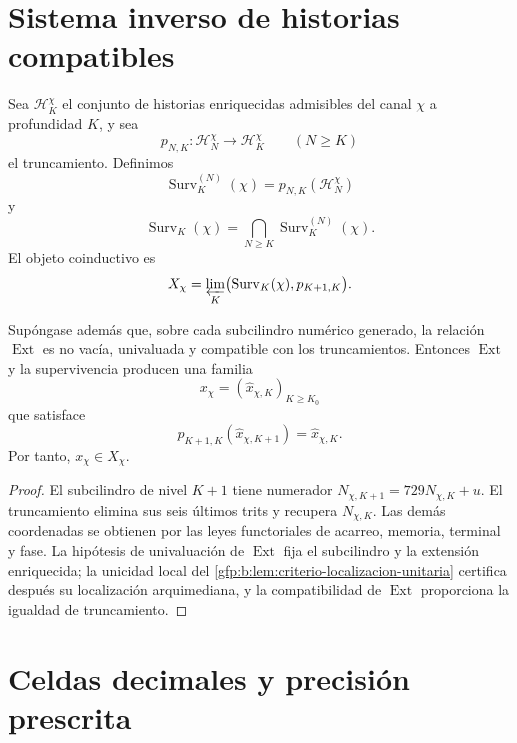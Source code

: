 \section{Sistema inverso de historias compatibles}

Sea \(\mathcal H_K^\chi\) el conjunto de historias enriquecidas admisibles
del canal \(\chi\) a profundidad \(K\), y sea
\[
 p_{N,K}:\mathcal H_N^\chi\longrightarrow\mathcal H_K^\chi
 \qquad(N\geq K)
\]
el truncamiento. Definimos
\[
 \operatorname{Surv}_K^{(N)}(\chi)
 =p_{N,K}(\mathcal H_N^\chi)
\]
y
\begin{equation}
 \operatorname{Surv}_K(\chi)
 =\bigcap_{N\geq K}\operatorname{Surv}_K^{(N)}(\chi).
 \label{gfp:b:eq:supervivencia-todas-profundidades}
\end{equation}
El objeto coinductivo es
\begin{equation}
 X_\chi=
 \varprojlim_K
 \bigl(\operatorname{Surv}_K(\chi),p_{K+1,K}\bigr).
 \label{gfp:b:eq:limite-inverso-caracteres}
\end{equation}

\begin{theorem}
\label{gfp:b:thm:seccion-compatible-caracteres}
Supóngase además que, sobre cada subcilindro numérico generado, la
relación \(\operatorname{Ext}\) es no vacía, univaluada y compatible con los
truncamientos. Entonces \(\operatorname{Ext}\) y la supervivencia producen una familia
\[
 x_\chi=(\widehat x_{\chi,K})_{K\geq K_0}
\]
que satisface
\[
 p_{K+1,K}(\widehat x_{\chi,K+1})
 =\widehat x_{\chi,K}.
\]
Por tanto, \(x_\chi\in X_\chi\).
\end{theorem}

\begin{proof}
El subcilindro de nivel \(K+1\) tiene numerador
\(N_{\chi,K+1}=729N_{\chi,K}+u\). El truncamiento elimina sus seis últimos
trits y recupera \(N_{\chi,K}\). Las demás coordenadas se obtienen por las
leyes functoriales de acarreo, memoria, terminal y fase. La hipótesis de
univaluación de \(\operatorname{Ext}\) fija el subcilindro y la extensión
enriquecida; la unicidad local del
\cref{gfp:b:lem:criterio-localizacion-unitaria} certifica después su
localización arquimediana, y la compatibilidad de \(\operatorname{Ext}\)
proporciona la igualdad de truncamiento.
\end{proof}

\section{Celdas decimales y precisión prescrita}

